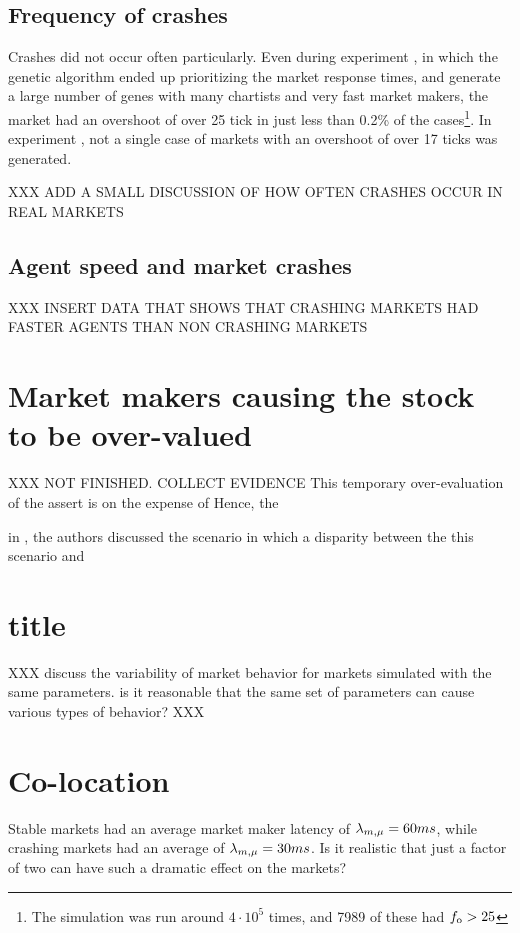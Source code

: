 \subsection{Frequency of crashes}

Crashes did not occur often particularly. Even during experiment \deleven, in which the genetic algorithm ended up prioritizing the market response times, and generate a large number of genes with many chartists and very fast market makers, the market had an overshoot of over 25 tick in just less than 0.2\% of the cases\footnote{The simulation was run around $4\cdot 10^5$ times, and 7989 of these had $f_\text{o} > 25$}. In experiment \dten, not a single case of markets with an overshoot of over 17 ticks was generated. 

XXX ADD A SMALL DISCUSSION OF HOW OFTEN CRASHES OCCUR IN REAL MARKETS

\subsection{Agent speed and market crashes}
XXX INSERT DATA THAT SHOWS THAT CRASHING MARKETS HAD FASTER AGENTS THAN NON CRASHING MARKETS


\section{Market makers causing the stock to be over-valued }
XXX NOT FINISHED. COLLECT EVIDENCE
This temporary over-evaluation of the assert is on the expense of Hence, the 

in \cite{}, the authors discussed the scenario in which a disparity between the this scenario and 


\section{title}
XXX discuss the variability of market behavior for markets simulated with the same parameters. is it reasonable that the same set of parameters can cause various types of behavior? XXX 


\section{Co-location}
Stable markets had an average market maker latency of $\lambda_{m, \mu} = 60 ms$, while crashing markets had an average of $\lambda_{m, \mu} = 30 ms$. Is it realistic that just a factor of two can have such a dramatic effect on the markets? 

